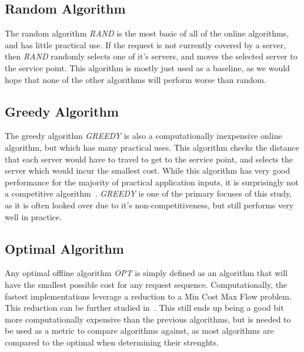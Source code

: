 
\subsection*{Random Algorithm}
\label{sec:rand}
The random algorithm \textit{RAND} is the most basic of all of the online algorithms, and has little practical use. If the request is not currently covered by a server, then \textit{RAND} randomly selects one of it's servers, and moves the selected server to the service point. This algorithm is mostly just used as a baseline, as we would hope that none of the other algorithms will perform worse than random.

\subsection*{Greedy Algorithm}
\label{sec:greedy}
The greedy algorithm \textit{GREEDY} is also a computationally inexpensive online algorithm, but which has many practical uses. This algorithm checks the distance that each server would have to travel to get to the service point, and selects the server which would incur the smallest cost. While this algorithm has very good performance for the majority of practical application inputs, it is surprisingly not a competitive algorithm~\cite{OnlineComp1998}. \textit{GREEDY} is one of the primary focuses of this study, as it is often looked over due to it's non-competitiveness, but still performs very well in practice.

\subsection*{Optimal Algorithm}
\label{sec:OPT}
Any optimal offline algorithm \textit{OPT} is simply defined as an algorithm that will have the smallest possible cost for any request sequence. Computationally, the fastest implementations leverage a reduction to a Min Cost Max Flow problem. This reduction can be further studied in~\cite{WFA2009}. This still ends up being a good bit more computationally expensive than the previous algorithms, but is needed to be used as a metric to compare algorithms against, as most algorithms are compared to the optimal when determining their strenghts.

